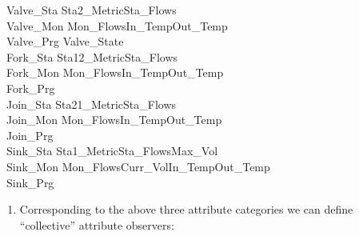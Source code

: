 \>\ Valve\_Sta {\EQ} Sta2\_Metric{\TIMES}Sta\_Flows{\TIMES}{\DOTDOTDOT}\\
\>\ Valve\_Mon {\EQ} Mon\_Flows{\TIMES}In\_Temp{\TIMES}Out\_Temp{\TIMES}{\DOTDOTDOT}\\
\>\ Valve\_Prg {\EQ} Valve\_State{\TIMES}{\DOTDOTDOT}\\
\>\ Fork\_Sta {\EQ} Sta12\_Metric{\TIMES}Sta\_Flows{\TIMES}{\DOTDOTDOT}\\
\>\ Fork\_Mon {\EQ} Mon\_Flows{\TIMES}In\_Temp{\TIMES}Out\_Temp{\TIMES}{\DOTDOTDOT}\\
\>\ Fork\_Prg {\EQ} {\DOTDOTDOT} \\
\>\ Join\_Sta {\EQ} Sta21\_Metric{\TIMES}Sta\_Flows{\TIMES}{\DOTDOTDOT}\\
\>\ Join\_Mon {\EQ} Mon\_Flows{\TIMES}In\_Temp{\TIMES}Out\_Temp{\TIMES}{\DOTDOTDOT}\\
\>\ Join\_Prg {\EQ} {\DOTDOTDOT}\\
\>\ Sink\_Sta {\EQ} Sta1\_Metric{\TIMES}Sta\_Flows{\TIMES}Max\_Vol{\TIMES}{\DOTDOTDOT}\\
\>\ Sink\_Mon {\EQ} Mon\_Flows{\TIMES}Curr\_Vol{\TIMES}In\_Temp{\TIMES}Out\_Temp{\TIMES}{\DOTDOTDOT}\\
\>\ Sink\_Prg {\EQ} {\DOTDOTDOT} 
\ep

\mnewfoil%
\normalsize\HHHH
\noindent
\begin{enumerate}\setei
\item \label{com-attr}Corresponding to the above three attribute categories
      we can define ``collective'' attribute observers:
\savei\end{enumerate}

